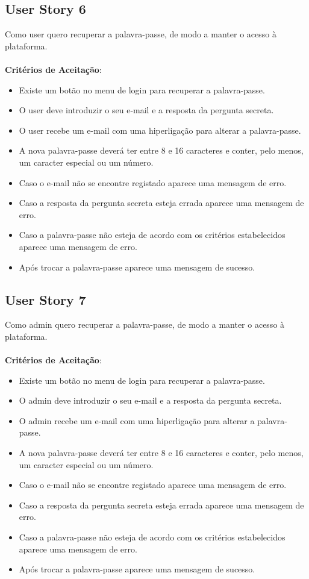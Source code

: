 \documentclass[a4paper,11pt]{article}
\begin{document}
\subsection{User Story 6}
Como user quero recuperar a palavra-passe, de modo a manter o acesso à plataforma.\\\\
\textbf{Critérios de Aceitação}:
\begin{itemize}
  \item Existe um botão no menu de login para recuperar a palavra-passe.
  \item O user deve introduzir o seu e-mail e a resposta da pergunta secreta.
  \item O user recebe um e-mail com uma hiperligação para alterar a palavra-passe.
  \item A nova palavra-passe deverá ter entre 8 e 16 caracteres e conter, pelo menos, um caracter especial ou um número.
  \item Caso o e-mail não se encontre registado aparece uma mensagem de erro.
  \item Caso a resposta da pergunta secreta esteja errada aparece uma mensagem de erro.
  \item Caso a palavra-passe não esteja de acordo com os critérios estabelecidos aparece uma mensagem de erro.
  \item Após trocar a palavra-passe aparece uma mensagem de sucesso.
\end{itemize}

\subsection{User Story 7}
Como admin quero recuperar a palavra-passe, de modo a manter o acesso à plataforma.\\\\
\textbf{Critérios de Aceitação}:
\begin{itemize}
  \item Existe um botão no menu de login para recuperar a palavra-passe.
  \item O admin deve introduzir o seu e-mail e a resposta da pergunta secreta.
  \item O admin recebe um e-mail com uma hiperligação para alterar a palavra-passe.
  \item A nova palavra-passe deverá ter entre 8 e 16 caracteres e conter, pelo menos, um caracter especial ou um número.
  \item Caso o e-mail não se encontre registado aparece uma mensagem de erro.
  \item Caso a resposta da pergunta secreta esteja errada aparece uma mensagem de erro.
  \item Caso a palavra-passe não esteja de acordo com os critérios estabelecidos aparece uma mensagem de erro.
  \item Após trocar a palavra-passe aparece uma mensagem de sucesso.
\end{itemize}
\end{document}

